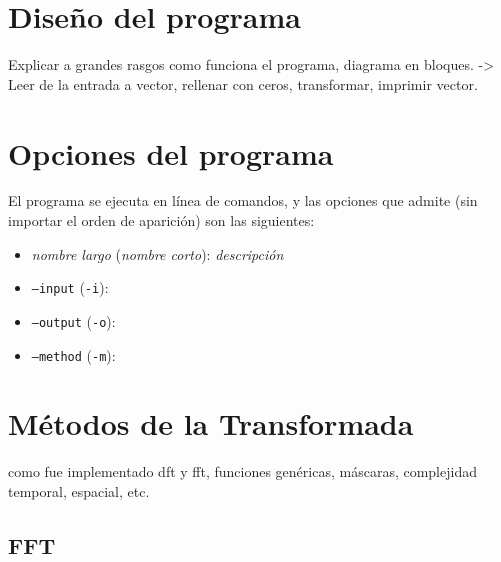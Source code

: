 \documentclass{article}
\begin{document}
\section{Diseño del programa}
  Explicar a grandes rasgos como funciona el programa, diagrama en bloques.
  -> Leer de la entrada a vector, rellenar con ceros, transformar, imprimir vector.

\section{Opciones del programa}
  El programa se ejecuta en línea de comandos, y las opciones que admite (sin importar el orden de aparición) son las siguientes:
  \begin{itemize}
    \item[] \textit{nombre largo} (\textit{nombre corto}): \textit{descripción}
    \item \texttt{--input} (\texttt{-i}): 
    \item \texttt{--output} (\texttt{-o}):
    \item \texttt{--method} (\texttt{-m}):
  \end{itemize}

\section{Métodos de la Transformada}
  como fue implementado dft y fft, funciones genéricas, máscaras, complejidad temporal, espacial, etc.
  \subsection{FFT}
\end{document}
